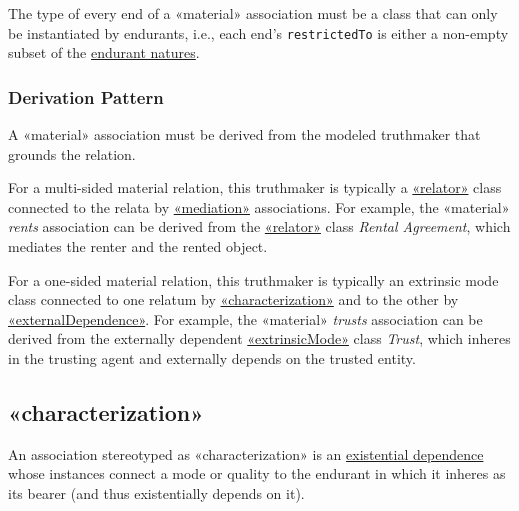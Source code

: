 The type of every end of a «material» association must be a class that can only be instantiated by endurants, i.e., each end's \texttt{restrictedTo} is either a non-empty subset of the \hyperref[par:endurant-nature]{endurant natures}.

\subsubsection{Derivation Pattern}

A «material» association must be derived from the modeled truthmaker that grounds the relation. 

For a multi-sided material relation, this truthmaker is typically a \hyperref[stereotype:relator]{«relator»} class connected to the relata by \hyperref[stereotype:mediation]{«mediation»} associations. For example, the «material» \textit{rents} association can be derived from the \hyperref[stereotype:relator]{«relator»} class \textit{Rental Agreement}, which mediates the renter and the rented object. 

For a one-sided material relation, this truthmaker is typically an extrinsic mode class connected to one relatum by  \hyperref[stereotype:characterization]{«characterization»} and to the other by \hyperref[stereotype:externalDependence]{«externalDependence»}. For example, the «material» \textit{trusts} association can be derived from the externally dependent \hyperref[stereotype:mode]{«extrinsicMode»} class \textit{Trust}, which inheres in the trusting agent and externally depends on the trusted entity.





\subsection{«characterization»}
\label{stereotype:characterization}

An association stereotyped as «characterization» is an \hyperref[stereotype:existential-dependence]{existential dependence} whose instances connect a mode or quality to the endurant in which it inheres as its bearer (and thus existentially depends on it).

